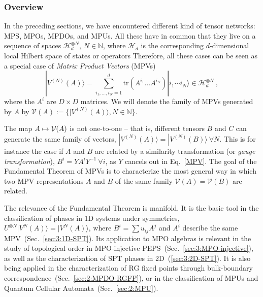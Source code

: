 \documentclass[rmp,aps,reprint,superscriptaddress,nobalancelastpage]{revtex4-1}
\newcommand{\ket}[1]{\vert#1\rangle}
\begin{document}
    \subsubsection{Overview}




    In the preceding sections, we have encountered different kind of tensor networks: MPS, MPOs, MPDOs, and MPUs.  All these have in common that they live on a sequence of spaces $\mathcal H_d^{\otimes N}$, $N\in\mathbb N$, where $\mathcal H_d$ is the corresponding $d$-dimensional local Hilbert space of states or operators
    Therefore, all these cases can be seen as a special case of \emph{Matrix Product Vectors} (MPVs)
    \begin{equation}
        \label{MPV}
        |V^{(N)}(A)\rangle = \!\!\!\!\!\sum_{i_1,\ldots,i_N=1}^d\!\! \mathrm{tr}\left( A^{i_1}\ldots  A^{i_N}\right) |i_1\cdots i_N\rangle \in \mathcal H_d^{\otimes N}\ ,
    \end{equation}
    where the $A^i$ are $D\times D$ matrices. We will denote the family of MPVs generated by $A$ by $\mathcal V(A):=\big\{\ket{V^{(N)}(A)}, N\in\mathbb N\big\}$.

    The map $A \mapsto {\cal V}(A)$
    is not one-to-one -- that is, different tensors $B$ and $C$ can generate the same family of vectors,  $|V^{(N)}(A)\rangle = |V^{(N)}(B)\rangle\ \forall N$.
    This is for instance the case if $A$ and $B$ are related by a similarity transformation (or \emph{gauge transformation}), $B^i=YA^{i}Y^{-1}\
\forall i$, as $Y$ cancels out in Eq.~\eqref{MPV}.
    The goal of the Fundamental Theorem of MPVs is to characterize the most general way in which two MPV representations $A$ and $B$ of the same family $\mathcal V(A)=\mathcal V(B)$ are related.

    The relevance of the Fundamental Theorem is manifold. It is the basic tool in
    the classification of phases in 1D systems under symmetries, $U^{\otimes N}\ket{V^{N}(A)}=\ket{V^{N}(A)}$, where $B^i=\sum u_{ij}A^j$ and $A^i$ describe the same MPV~(Sec.~\ref{sec:3:1D-SPT}).
    Its application to MPO algebras is relevant in the study of topological order in MPO-injective PEPS~(Sec.~\ref{sec:3:MPO-injective}), as well as the characterization of SPT phases in 2D~(\ref{sec:3:2D-SPT}).  It is also being applied in the characterization of RG fixed points through bulk-boundary correspondence~(Sec.~\ref{sec:2:MPDO-RGFP}), or in the classification of MPUs and Quantum Cellular Automata~(Sec.~\ref{sec:2:MPU}).
\end{document}
